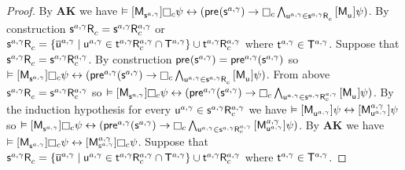 \begin{proof}
By {\bf AK} we have $\entails \actionA{\aPModel{\aStateS[\agentA, \gamma]}} \necessaryC \psi \iff (\aPrecondition(\aStateS[\agentA, \gamma]) \implies \necessaryC \bigwedge_{\aStateU[\agentA, \gamma] \in \aSuccessorsC{\aStateS[\agentA, \gamma]}} \actionA{\aPModel{\aStateU}} \psi)$.
By construction
$\aSuccessorsC{\aStateS[\agentA, \gamma]} = \aSuccessorsC[\agentA, \gamma]{\aStateS[\agentA, \gamma]}$ or 
$\aSuccessorsC{\aStateS[\agentA, \gamma]} = \{\aPStateU[\agentA, \gamma] \mid \aStateU[\agentA, \gamma] \in \aSuccessorsC[\agentA, \gamma]{\aStateT[\agentA, \gamma]} \cap \aStatesT[\agentA, \gamma]\} \cup \aSuccessorsC[\agentA, \gamma]{\aStateT[\agentA, \gamma]}$ where $\aStateT[\agentA, \gamma] \in \aStatesT[\agentA, \gamma]$.
Suppose that $\aSuccessorsC{\aStateS[\agentA, \gamma]} = \aSuccessorsC[\agentA, \gamma]{\aStateS[\agentA, \gamma]}$.
By construction $\aPrecondition(\aStateS[\agentA, \gamma]) = \aPrecondition[\agentA, \gamma](\aStateS[\agentA, \gamma])$ so $\entails \actionA{\aPModel{\aStateS[\agentA, \gamma]}} \necessaryC \psi \iff (\aPrecondition[\agentA, \gamma](\aStateS[\agentA, \gamma]) \implies \necessaryC \bigwedge_{\aStateU[\agentA, \gamma] \in \aSuccessorsC{\aStateS[\agentA, \gamma]}} \actionA{\aPModel{\aStateU}} \psi)$.
From above $\aSuccessorsC{\aStateS[\agentA, \gamma]} = \aSuccessorsC[\agentA, \gamma]{\aStateS[\agentA, \gamma]}$ so $\entails \actionA{\aPModel{\aStateS[\agentA, \gamma]}} \necessaryC \psi \iff (\aPrecondition[\agentA, \gamma](\aStateS[\agentA, \gamma]) \implies \necessaryC \bigwedge_{\aStateU[\agentA, \gamma] \in \aSuccessorsC[\agentA, \gamma]{\aStateS[\agentA, \gamma]}} \actionA{\aPModel{\aStateU}} \psi)$.
By the induction hypothesis for every $\aStateU[\agentA, \gamma] \in \aSuccessorsC[\agentA, \gamma]{\aStateS[\agentA, \gamma]}$ we have $\entails \actionA{\aPModel{\aStateU[\agentA, \gamma]}} \psi \iff \actionA{\aPModel[\agentA, \gamma]{\aStateU[\agentA, \gamma]}} \psi$ so $\entails \actionA{\aPModel{\aStateS[\agentA, \gamma]}} \necessaryC \psi \iff (\aPrecondition[\agentA, \gamma](\aStateS[\agentA, \gamma]) \implies \necessaryC \bigwedge_{\aStateU[\agentA, \gamma] \in \aSuccessorsC[\agentA, \gamma]{\aStateS[\agentA, \gamma]}} \actionA{\aPModel[\agentA, \gamma]{\aStateU[\agentA, \gamma]}} \psi)$.
By {\bf AK} we have $\entails \actionA{\aPModel{\aStateS[\agentA, \gamma]}} \necessaryC \psi \iff \actionA{\aPModel[\agentA, \gamma]{\aStateS[\agentA, \gamma]}} \necessaryC \psi$.
Suppose that $\aSuccessorsC{\aStateS[\agentA, \gamma]} = \{\aPStateU[\agentA, \gamma] \mid \aStateU[\agentA, \gamma] \in \aSuccessorsC[\agentA, \gamma]{\aStateT[\agentA, \gamma]} \cap \aStatesT[\agentA, \gamma]\} \cup \aSuccessorsC[\agentA, \gamma]{\aStateT[\agentA, \gamma]}$ where $\aStateT[\agentA, \gamma] \in \aStatesT[\agentA, \gamma]$.

\end{proof}
